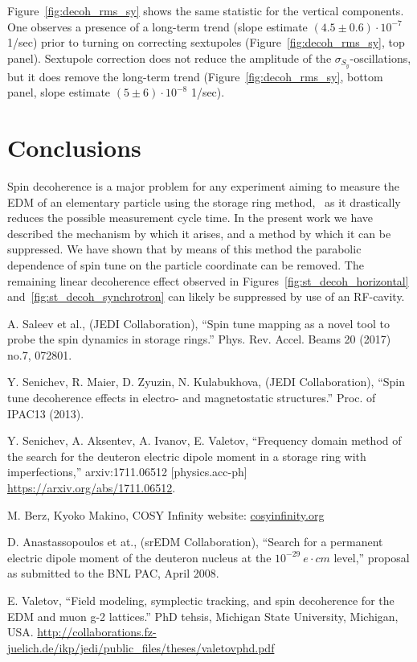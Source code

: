 \documentclass[a4paper]{jacow}
\begin{document}
Figure~\ref{fig:decoh_rms_sy} shows the same statistic for the vertical components. One observes a presence of a long-term trend (slope estimate $(4.5 \pm 0.6)\cdot 10^{-7}$ 1/sec) prior to turning on correcting sextupoles (Figure~\ref{fig:decoh_rms_sy}, top panel). Sextupole correction does not reduce the amplitude of the $\sigma_{S_y}$-oscillations, but it does remove the long-term trend (Figure~\ref{fig:decoh_rms_sy}, bottom panel,
slope estimate $(5 \pm 6) \cdot 10^{-8}$ 1/sec).

\section{Conclusions}
Spin decoherence is a major problem for any experiment aiming to measure the EDM of an elementary particle
using the storage ring method,~\cite{BNL:Deuteron2008} as it drastically reduces the
possible measurement cycle time. In the present work we have described the mechanism by which it arises,
and a method by which it can be suppressed. We have shown that by means of this method the
parabolic dependence of spin tune on the particle coordinate can be removed. The remaining
linear decoherence effect observed in Figures~\ref{fig:st_decoh_horizontal} and~\ref{fig:st_decoh_synchrotron}
can likely be suppressed by use of an RF-cavity.~\cite[p.~210]{Eremey:Thesis}

\begin{thebibliography}{9}
  
  A. Saleev et al., (JEDI Collaboration), ``Spin tune mapping as a novel tool to probe
  the spin dynamics in storage rings.'' Phys. Rev. Accel. Beams 20 (2017) no.7, 072801.

  Y. Senichev, R. Maier, D. Zyuzin, N. Kulabukhova, (JEDI Collaboration), ``Spin tune decoherence effects
  in electro- and magnetostatic structures.'' Proc. of IPAC13 (2013).

  Y. Senichev, A. Aksentev, A. Ivanov, E. Valetov, ``Frequency domain method of the search for
  the deuteron electric dipole moment in a storage ring with imperfections,'' arxiv:1711.06512 [physics.acc-ph]
  \url{https://arxiv.org/abs/1711.06512}.

  M. Berz, Kyoko Makino, COSY Infinity website: \url{cosyinfinity.org}

  D. Anastassopoulos et at., (srEDM Collaboration), ``Search for a permanent electric dipole moment of
  the deuteron nucleus at the $10^{-29}~e\cdot cm$ level,'' proposal as submitted to the BNL PAC, April 2008.

  E. Valetov, ``Field modeling, symplectic tracking, and spin decoherence for the EDM and muon g-2 lattices.''
  PhD tehsis, Michigan State University, Michigan, USA.
  \url{http://collaborations.fz-juelich.de/ikp/jedi/public_files/theses/valetovphd.pdf}
  
\end{thebibliography}
\end{document}
